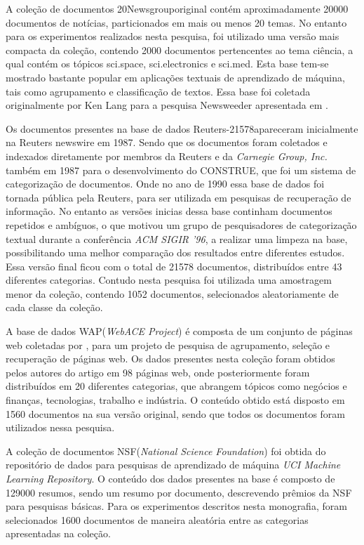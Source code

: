 A coleção de documentos 20Newsgroup\footnotemark original contém aproximadamente 20000 documentos de notícias,
particionados em mais ou menos 20 temas. No entanto para os experimentos realizados nesta pesquisa, 
foi utilizado uma versão mais
compacta da coleção, contendo 2000 documentos pertencentes ao tema ciência, a qual contém os tópicos
sci.space, sci.electronics e sci.med. Esta base tem-se mostrado bastante popular em
aplicações textuais de aprendizado de máquina\cite{Nogueira2015}, tais como agrupamento e 
classificação de textos.
Essa base foi coletada originalmente por Ken Lang para a pesquisa Newsweeder apresentada em
\cite{Lang1995}. 

Os documentos presentes na base de dados Reuters-21578\footnotemark apareceram inicialmente na Reuters newswire
em 1987. Sendo que os documentos foram coletados e indexados diretamente por membros da Reuters e da
{\it Carnegie Group, Inc.} também em 1987 para o desenvolvimento do CONSTRUE\cite{Hayes1990}, que
foi um sistema de categorização de documentos. Onde no ano de 1990 essa base de dados foi tornada
pública pela Reuters, para ser utilizada em pesquisas de recuperação de informação. No entanto as
versões inicias dessa base continham documentos repetidos e ambíguos, o que motivou um grupo de
pesquisadores de categorização textual durante a conferência {\it ACM SIGIR '96\/}, a realizar uma
limpeza na base, possibilitando uma melhor comparação dos resultados entre diferentes estudos. Essa
versão final ficou com o total de 21578 documentos, distribuídos entre 43 diferentes categorias. 
Contudo
nesta pesquisa foi utilizada uma amostragem menor da coleção, contendo 1052 documentos, selecionados
aleatoriamente de cada classe da coleção.

A base de dados WAP({\it WebACE Project\/}) é composta de um conjunto de páginas web coletadas por 
, para um projeto de pesquisa de agrupamento, seleção e recuperação de páginas web.
Os dados presentes nesta coleção foram obtidos pelos autores do artigo em 98 páginas web, onde
posteriormente foram distribuídos em 20 diferentes categorias, que abrangem tópicos como negócios e 
finanças, tecnologias, trabalho e
indústria. O conteúdo obtido está disposto em 1560 documentos na sua versão original, sendo que
todos os documentos foram utilizados nessa pesquisa.

A coleção de documentos NSF\footnotemark({\it National Science Foundation\/}) foi obtida do 
repositório de dados para pesquisas de aprendizado de máquina 
{\it UCI Machine Learning Repository}\cite{Frank2010}. O conteúdo dos dados presentes na base é
composto de 129000 resumos, sendo um resumo por documento, descrevendo prêmios da NSF para 
pesquisas básicas. Para os experimentos descritos nesta monografia, foram selecionados 1600 
documentos de maneira aleatória entre as categorias apresentadas na coleção.


